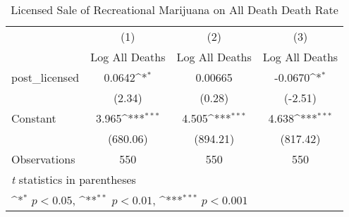 \begin{table}[htbp]\centering
\def\sym#1{\ifmmode^{#1}\else\(^{#1}\)\fi}
\caption{Licensed Sale of Recreational Marijuana on All Death Death Rate}
\begin{tabular}{l*{3}{c}}
\hline\hline
                    &\multicolumn{1}{c}{(1)}&\multicolumn{1}{c}{(2)}&\multicolumn{1}{c}{(3)}\\
                    &\multicolumn{1}{c}{Log All Deaths}&\multicolumn{1}{c}{Log All Deaths}&\multicolumn{1}{c}{Log All Deaths}\\
\hline
post\_licensed       &      0.0642\sym{*}  &     0.00665         &     -0.0670\sym{*}  \\
                    &      (2.34)         &      (0.28)         &     (-2.51)         \\
[1em]
Constant            &       3.965\sym{***}&       4.505\sym{***}&       4.638\sym{***}\\
                    &    (680.06)         &    (894.21)         &    (817.42)         \\
\hline
Observations        &         550         &         550         &         550         \\
\hline\hline
\multicolumn{4}{l}{\footnotesize \textit{t} statistics in parentheses}\\
\multicolumn{4}{l}{\footnotesize \sym{*} \(p<0.05\), \sym{**} \(p<0.01\), \sym{***} \(p<0.001\)}\\
\end{tabular}
\end{table}
